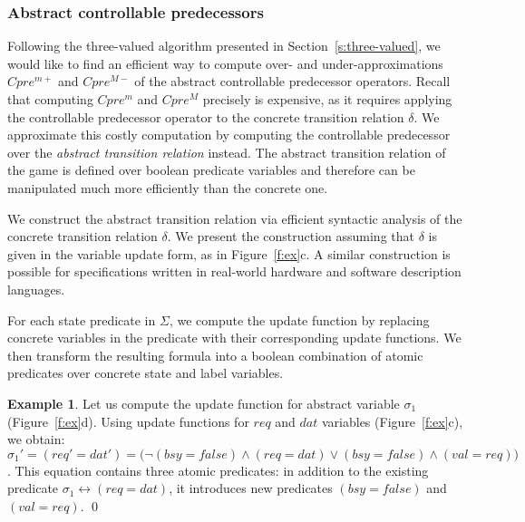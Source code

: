 \documentclass{book}
\theoremstyle{definition}
\newtheorem*{ex}{Example}
\begin{document}
\subsubsection{Abstract controllable predecessors}\label{s:cpre}

Following the three-valued algorithm presented in Section~\ref{s:three-valued}, we would like to find an efficient way to compute over- and under-approximations $Cpre^{m+}$ and $Cpre^{M-}$ of the abstract controllable predecessor operators. Recall that computing $Cpre^m$ and $Cpre^M$ precisely is expensive, as it requires applying the controllable predecessor operator to the concrete transition relation $\delta$. We approximate this costly computation by computing the controllable predecessor over the \emph{abstract transition relation} instead. The abstract transition relation of the game is defined over boolean predicate variables and therefore can be manipulated much more efficiently than the concrete one.

We construct the abstract transition relation via efficient syntactic analysis of the concrete transition relation $\delta$. We present the construction assuming that $\delta$ is given in the variable update form, as in Figure~\ref{f:ex}c. A similar construction is possible for specifications written in real-world hardware and software description languages.

For each state predicate in $\Sigma$, we compute the update function by replacing concrete variables in the predicate with their corresponding update functions. We then transform the resulting formula into a boolean combination of atomic predicates over concrete state and label variables.

\begin{ex}
    \everymath{\mathtt{\xdef\tmp{\fam\the\fam\relax}\aftergroup\tmp}}
    \everydisplay{\mathtt{\xdef\tmp{\fam\the\fam\relax}\aftergroup\tmp}}
    Let us compute the update function for abstract variable $\sigma_1$ (Figure~\ref{f:ex}d).  Using update functions for $req$ and $dat$ variables (Figure~\ref{f:ex}c), we obtain: $\sigma_1' = (req' = dat') = \big(\neg(bsy = false) \land (req=dat) \lor (bsy=false) \land (val=req)\big)$. This equation contains three atomic predicates: in addition to the existing predicate $\sigma_1 \leftrightarrow (req=dat)$, it introduces new predicates $(bsy=false)$ and $(val=req)$.  
    \qed
\end{ex}
\end{document}
